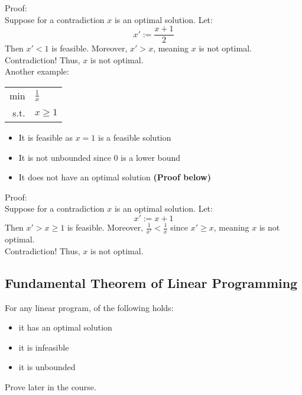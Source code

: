 \documentclass[letterpaper, 12pt]{article}
\newcommand{\red}[1]{{\color{red}{#1}}}
\begin{document}
    Proof:\\
    Suppose for a contradiction $x$ is an optimal solution. Let:
    $$ x':= \frac{x+1}{2}$$
    Then $x' < 1$ is feasible. Moreover, $x' > x$, meaning $x$ is not optimal.\\
    Contradiction! Thus, $x$ is not optimal.\\

    \bigskip
    Another example:\\
    \begin{tabular}{rl}
        min & $\frac{1}{x}$\\
        s.t. & $x \geq 1$\\
    \end{tabular}

    \begin{itemize}
        \item It is feasible as $x = 1$ is a feasible solution
        \item It is not unbounded since $0$ is a lower bound
        \item It does not have an optimal solution \textbf{(Proof below)}
    \end{itemize}

    Proof:\\
    Suppose for a contradiction $x$ is an optimal solution. Let:
    $$ x':= x + 1$$
    Then $x' > x \geq 1$ is feasible. Moreover, $\frac{1}{x'} < \frac{1}{x}$ since $x' \geq x$, meaning $x$ is not optimal.\\
    Contradiction! Thus, $x$ is not optimal.\\

    \pagebreak
    \subsection{Fundamental Theorem of Linear Programming}
    For any linear program, \red{exactly one} of the following holds:
    \begin{itemize}
        \item it has an optimal solution
        \item it is infeasible
        \item it is unbounded
    \end{itemize}
    Prove later in the course.
\end{document}
